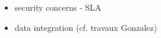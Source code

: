 
\begin{itemize}
\item security concerns - SLA 
\item data integration (cf. travaux Gonzalez) 
\end{itemize}
